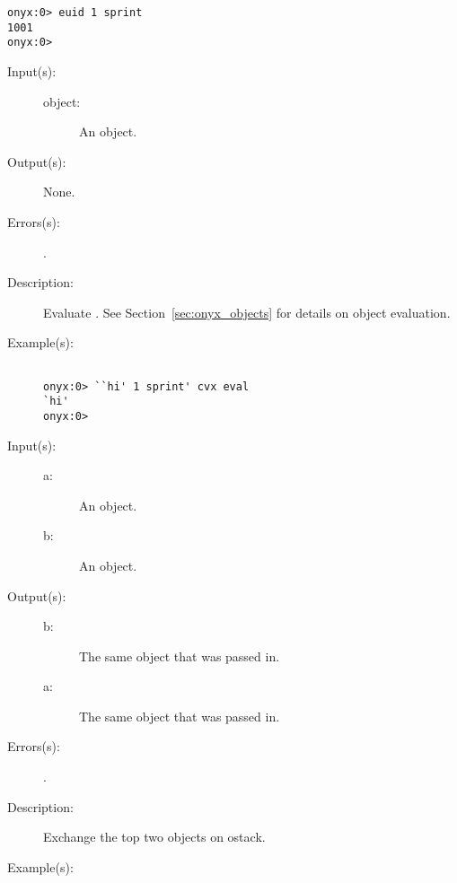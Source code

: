 \begin{description}
\begin{description}
\begin{verbatim}
onyx:0> euid 1 sprint
1001
onyx:0>
		\end{verbatim}
	\end{description}
\label{systemdict:eval}
\item[{\onyxop{object}{eval}{--}}: ]
	\begin{description}\item[]
	\item[Input(s): ]
		\begin{description}\item[]
		\item[object: ]
			An object.
		\end{description}
	\item[Output(s): ] None.
	\item[Errors(s): ]
		\begin{description}\item[]
		\item[.]
		\end{description}
	\item[Description: ]
		Evaluate .  See Section~\ref{sec:onyx_objects} for
		details on object evaluation.
	\item[Example(s): ]\begin{verbatim}

onyx:0> ``hi' 1 sprint' cvx eval
`hi'
onyx:0>
		\end{verbatim}
	\end{description}
\label{systemdict:exch}
\item[{\onyxop{a b}{exch}{b a}}: ]
	\begin{description}\item[]
	\item[Input(s): ]
		\begin{description}\item[]
		\item[a: ]
			An object.
		\item[b: ]
			An object.
		\end{description}
	\item[Output(s): ]
		\begin{description}\item[]
		\item[b: ]
			The same object that was passed in.
		\item[a: ]
			The same object that was passed in.
		\end{description}
	\item[Errors(s): ]
		\begin{description}\item[]
		\item[.]
		\end{description}
	\item[Description: ]
		Exchange the top two objects on ostack.
	\item[Example(s): ]\begin{verbatim}


\end{verbatim}
\end{description}
\end{description}
